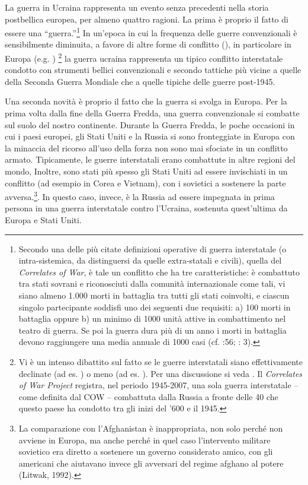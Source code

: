 \documentclass[
]{book}
\begin{document}
La guerra in Ucraina rappresenta un evento senza precedenti nella storia postbellica europea, per almeno quattro ragioni. La prima è proprio il fatto di essere una ``guerra.''\footnote{Secondo una delle più citate definizioni operative di guerra interstatale (o intra-sistemica, da distinguersi da quelle extra-statali e civili), quella del \emph{Correlates of War}, è tale un conflitto che ha tre caratteristiche: è combattuto tra stati sovrani e riconosciuti dalla comunità internazionale come tali, vi siano almeno 1.000 morti in battaglia tra tutti gli stati coinvolti, e ciascun singolo partecipante soddisfi uno dei seguenti due requisiti: a) 100 morti in battaglia oppure b) un minimo di 1000 unità attive in combattimento nel teatro di guerra. Se poi la guerra dura più di un anno i morti in battaglia devono raggiungere una media annuale di 1000 casi (cf. \citet{Small-Singer1982} :56; \citet{Sarkees} : 3).} In un'epoca in cui la frequenza delle guerre convenzionali è sensibilmente diminuita, a favore di altre forme di conflitto (\citet{Sarkees-Wayman-Singer2003}), in particolare in Europa (e.g. \citet{Gaddis1986}) \footnote{Vi è un intenso dibattito sul fatto se le guerre interstatali siano effettivamente declinate (ad es. \citet{Pinker2011}) o meno (ad es. \citet{Braumoeller2019}). Per una discussione si veda \citet{Gleditsch-Pinker-Thayer-Levy-Thompson2013}. Il \emph{Correlates of War Project} registra, nel periodo 1945-2007, una sola guerra interstatale -- come definita dal COW -- combattuta dalla Russia a fronte delle 40 che questo paese ha condotto tra gli inizi del '600 e il 1945.} la guerra ucraina rappresenta un tipico conflitto interstatale condotto con strumenti bellici convenzionali e secondo tattiche più vicine a quelle della Seconda Guerra Mondiale che a quelle tipiche delle guerre post-1945.

Una seconda novità è proprio il fatto che la guerra si svolga in Europa. Per la prima volta dalla fine della Guerra Fredda, una guerra convenzionale si combatte sul suolo del nostro continente. Durante la Guerra Fredda, le poche occasioni in cui i paesi europei, gli Stati Uniti e la Russia si sono fronteggiate in Europa con la minaccia del ricorso all'uso della forza non sono mai sfociate in un conflitto armato. Tipicamente, le guerre interstatali erano combattute in altre regioni del mondo, Inoltre, sono stati più spesso gli Stati Uniti ad essere invischiati in un conflitto (ad esempio in Corea e Vietnam), con i sovietici a sostenere la parte avversa.\footnote{La comparazione con l'Afghanistan è inappropriata, non solo perché non avviene in Europa, ma anche perché in quel caso l'intervento militare sovietico era diretto a sostenere un governo considerato amico, con gli americani che aiutavano invece gli avversari del regime afghano al potere (Litwak, 1992).}. In questo caso, invece, è la Russia ad essere impegnata in prima persona in una guerra interstatale contro l'Ucraina, sostenuta quest'ultima da Europa e Stati Uniti.
\end{document}

